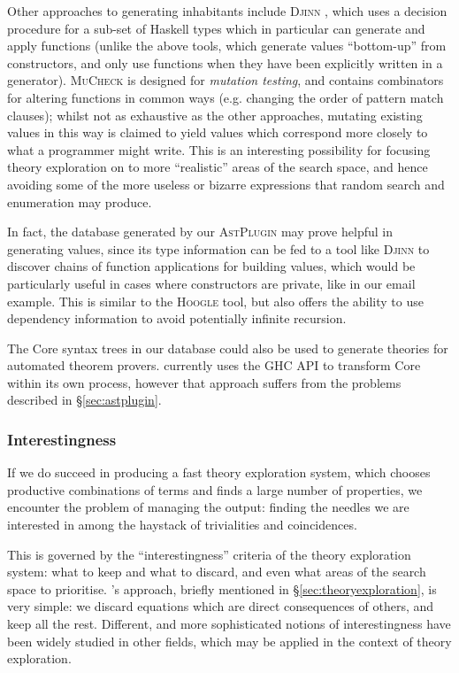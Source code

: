 Other approaches to generating inhabitants include \textsc{Djinn} \citep{augustsson2005djinn}, which uses a decision procedure for a sub-set of Haskell types which in particular can generate and apply functions (unlike the above tools, which generate values ``bottom-up'' from constructors, and only use functions when they have been explicitly written in a generator). \textsc{MuCheck} \citep{le2014mucheck} is designed for \emph{mutation testing}, and contains combinators for altering functions in common ways (e.g. changing the order of pattern match clauses); whilst not as exhaustive as the other approaches, mutating existing values in this way is claimed to yield values which correspond more closely to what a programmer might write. This is an interesting possibility for focusing theory exploration on to more ``realistic'' areas of the search space, and hence avoiding some of the more useless or bizarre expressions that random search and enumeration may produce.

In fact, the database generated by our \textsc{AstPlugin} may prove helpful in generating values, since its type information can be fed to a tool like \textsc{Djinn} to discover chains of function applications for building values, which would be particularly useful in cases where constructors are private, like in our email example. This is similar to the \textsc{Hoogle} tool, but also offers the ability to use dependency information to avoid potentially infinite recursion.

The Core syntax trees in our database could also be used to generate theories for automated theorem provers. \hspec{} currently uses the GHC API to transform Core within its own process, however that approach suffers from the problems described in \S \ref{sec:astplugin}.

\subsubsection{Interestingness}
\label{sec:interestingness}

If we do succeed in producing a fast theory exploration system, which chooses productive combinations of terms and finds a large number of properties, we encounter the problem of managing the output: finding the needles we are interested in among the haystack of trivialities and coincidences.

This is governed by the ``interestingness'' criteria of the theory exploration system: what to keep and what to discard, and even what areas of the search space to prioritise. \qspec{}'s approach, briefly mentioned in \S \ref{sec:theoryexploration}, is very simple: we discard equations which are direct consequences of others, and keep all the rest. Different, and more sophisticated notions of interestingness have been widely studied in other fields, which may be applied in the context of theory exploration.

